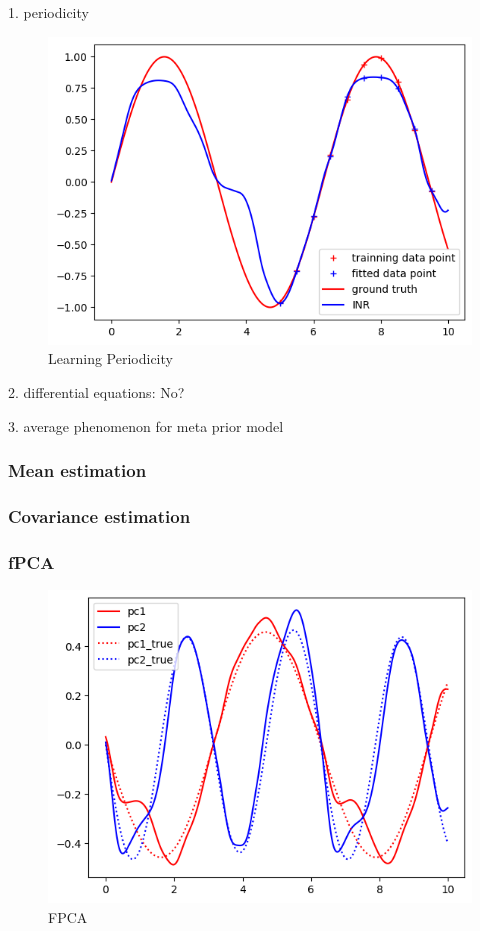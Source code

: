\documentclass{article}
\begin{document}
1. periodicity
\begin{figure}
  \centering
  \includegraphics[width=\textwidth]{learning_periodicity.png}
  \caption{Learning Periodicity}
\end{figure}

2. differential equations: No?

3. average phenomenon for meta prior model

\subsubsection{Mean estimation}

\subsubsection{Covariance estimation}

\subsubsection{fPCA}
\begin{figure}
  \centering
  \includegraphics[width=\textwidth]{fPCA.png}
  \caption{FPCA}
\end{figure}
\end{document}
